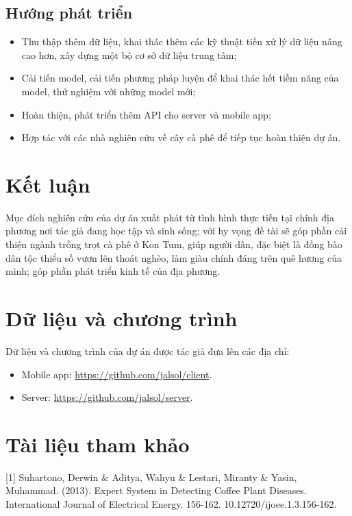 \documentclass[a4paper,14pt]{extarticle}
\begin{document}
	\subsection{Hướng phát triển}
	\begin{itemize}
		\item Thu thập thêm dữ liệu, khai thác thêm các kỹ thuật tiền xử lý dữ liệu nâng cao hơn, xây dựng một bộ cơ sở dữ liệu trung tâm;
		\item Cải tiến model, cải tiến phương pháp luyện để khai thác hết tiềm năng của model, thử nghiệm với những model mới;
		\item Hoàn thiện, phát triển thêm API cho server và mobile app;
		\item Hợp tác với các nhà nghiên cứu về cây cà phê để tiếp tục hoàn thiện dự án.
	\end{itemize}

\section{Kết luận}
Mục đích nghiên cứu của dự án xuất phát từ tình hình thực tiễn tại chính địa phương nơi tác giả đang học tập và sinh sống; với hy vọng đề tài sẽ góp phần cải thiện ngành trồng trọt cà phê ở Kon Tum, giúp người dân, đặc biệt là đồng bào dân tộc thiểu số vươn lên thoát nghèo, làm giàu chính đáng trên quê hương của mình; góp phần phát triển kinh tế của địa phương.

\section{Dữ liệu và chương trình}
Dữ liệu và chương trình của dự án được tác giả đưa lên các địa chỉ:

\begin{itemize}
	\item Mobile app: \url{https://github.com/jalsol/client}.
	\item Server: \url{https://github.com/jalsol/server}.
\end{itemize}

\section{Tài liệu tham khảo}
[1] Suhartono, Derwin \& Aditya, Wahyu \& Lestari, Miranty \& Yasin,\\Muhammad. (2013). Expert System in Detecting Coffee Plant Diseases. International Journal of Electrical Energy. 156-162. 10.12720/ijoee.1.3.156-162.
\end{document}
